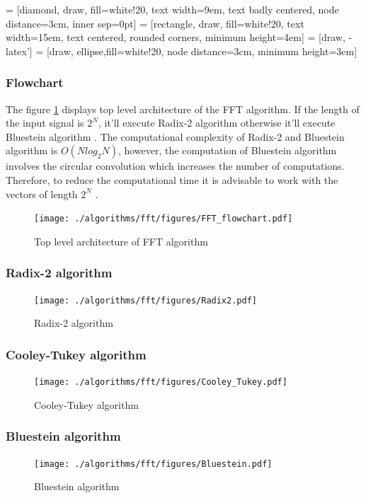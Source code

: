 \begin{refsection}
\newpage
 = [diamond, draw, fill=white!20,
text width=9em, text badly centered, node distance=3cm, inner sep=0pt]
 = [rectangle, draw, fill=white!20,
text width=15em, text centered, rounded corners, minimum height=4em]
 = [draw, -latex']
 = [draw, ellipse,fill=white!20, node distance=3cm,
minimum height=3em]

\subsubsection{Flowchart}
The figure \ref{FFT_flowchart} displays top level architecture of the FFT algorithm.  If the length of the input signal is $2^N$, it'll execute Radix-2 algorithm otherwise it'll execute Bluestein algorithm \cite{Rao2010a}. The computational complexity of Radix-2 and Bluestein algorithm is $O(Nlog_{2}N)$, however, the computation of Bluestein algorithm involves the circular convolution which increases the number of computations. Therefore, to reduce the computational time it is advisable to work with the vectors of length $2^N$ \cite{Chu2000}.


\begin{figure}[h]
	\centering
	\texttt{[image: ./algorithms/fft/figures/FFT\_flowchart.pdf]}
	\caption{Top level architecture of FFT algorithm}\label{FFT_flowchart}
\end{figure}



\newpage
\subsubsection{Radix-2 algorithm}
\begin{figure}[h]
	\centering
	\texttt{[image: ./algorithms/fft/figures/Radix2.pdf]}
	\caption{Radix-2 algorithm}\label{Radix-2}
\end{figure}

\newpage
\subsubsection{Cooley-Tukey algorithm}
\begin{figure}[h]
	\centering
	\texttt{[image: ./algorithms/fft/figures/Cooley\_Tukey.pdf]}
	\caption{Cooley-Tukey algorithm}\label{Cooley_Tukey}
\end{figure}

\newpage
\subsubsection{Bluestein algorithm}
\begin{figure}[h]
	\centering
	\texttt{[image: ./algorithms/fft/figures/Bluestein.pdf]}
	\caption{Bluestein algorithm}\label{Bluestein}
\end{figure}


\end{refsection}
